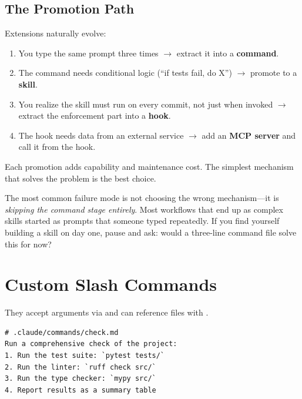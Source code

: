 \subsection*{The Promotion Path}

Extensions naturally evolve:

\begin{enumerate}
  \item You type the same prompt three times $\rightarrow$ extract it into a \textbf{command}.
  \item The command needs conditional logic (``if tests fail, do X'')
    $\rightarrow$ promote to a \textbf{skill}.
  \item You realize the skill must run on every commit, not just when invoked
    $\rightarrow$ extract the enforcement part into a \textbf{hook}.
  \item The hook needs data from an external service
    $\rightarrow$ add an \textbf{MCP server} and call it from the hook.
\end{enumerate}

\noindent Each promotion adds capability and maintenance cost.
The simplest mechanism that solves the problem is the best choice.

\begin{keyinsight}
The most common failure mode is not choosing the wrong mechanism---it is
\emph{skipping the command stage entirely}. Most workflows that end up
as complex skills started as prompts that someone typed repeatedly.
If you find yourself building a skill on day one, pause and ask:
would a three-line command file solve this for now?
\end{keyinsight}

\section{Custom Slash Commands}
\label{sec:commands}


They accept arguments via  and can reference files with .

\begin{verbatim}
# .claude/commands/check.md
Run a comprehensive check of the project:
1. Run the test suite: `pytest tests/`
2. Run the linter: `ruff check src/`
3. Run the type checker: `mypy src/`
4. Report results as a summary table
\end{verbatim}

